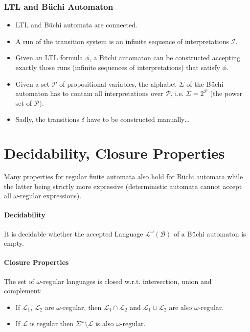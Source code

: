 \documentclass[a4paper, 11pt, accentcolor = tud3b]{tudreport}
\begin{document}
				\subsubsection{LTL and Büchi Automaton}
					\begin{itemize}
						\item LTL and Büchi automata are connected.
						\item A run of the transition system is an infinite sequence of interpretations \(\mathcal{I}\).
						\item Given an LTL formula \(\phi\), a Büchi automaton can be constructed accepting exactly those runs (infinite sequences of interpretations) that satisfy \(\phi\).
						\item Given a set \(\mathcal{P}\) of propositional variables, the alphabet \(\Sigma\) of the Büchi automaton has to contain all interpretations over \(\mathcal{P}\), i.e. \(\Sigma = 2^\mathcal{P}\) (the power set of \(\mathcal{P})\).
						\item Sadly, the transitions \(\delta\) have to be constructed manually\dots
					\end{itemize}

		\section{Decidability, Closure Properties}
			Many properties for regular finite automata also hold for Büchi automata while the latter being strictly more expressive (deterministic automata cannot accept all \(\omega\)-regular expressions).
			
			\paragraph{Decidability}
				It is decidable whether the accepted Language \( \mathcal{L}^\omega(\mathcal{B}) \) of a Büchi automaton is empty.
			
			\paragraph{Closure Properties}
				The set of \(\omega\)-regular languages is closed w.r.t. intersection, union and complement:
				\begin{itemize}
					\item If \(\mathcal{L}_1\), \(\mathcal{L}_2\) are \(\omega\)-regular, then \( \mathcal{L}_1 \cap \mathcal{L}_2 \) and \( \mathcal{L}_1 \cup \mathcal{L}_2 \) are also \(\omega\)-regular.
					\item If \(\mathcal{L}\) is regular then \( \Sigma^\omega \setminus \mathcal{L} \) is also \(\omega\)-regular.
				\end{itemize}
\end{document}
